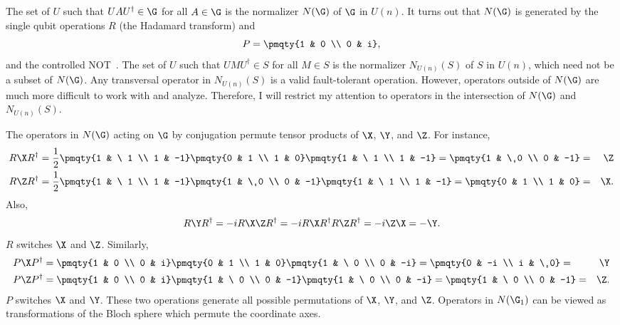 The set of $U$ such that $U A U^\dagger \in \G$ for all $A \in \G$ is the
normalizer $N(\G)$ of $\G$ in $U(n)$.  It turns out that $N(\G)$ is
generated by the single qubit operations $R$ (the Hadamard transform)
and
\begin{equation}
	P = \pmqty{1 & 0 \\ 0 & i},
\end{equation}
and the controlled NOT~\cite{bennett-tome,calderbank-stab}.  The set of
$U$ such that $U M U^\dagger \in S$ for all $M \in S$ is the normalizer
$N_{U(n)}(S)$ of $S$ in $U(n)$, which need not be a subset of $N(\G)$.  Any
transversal operator in $N_{U(n)}(S)$ is a valid fault-tolerant operation.
However, operators outside of $N(\G)$ are much more difficult to work
with and analyze.  Therefore, I will restrict my attention to operators in
the intersection of $N(\G)$ and $N_{U(n)}(S)$.

The operators in $N(\G)$ acting on $\G$ by conjugation permute tensor products
of $\X$, $\Y$, and $\Z$.  For instance,
\begin{eqnarray}
	R \X R^\dagger & = \frac{1}{2} \pmqty{1 & \ 1 \\ 1 & -1} \pmqty{0 &
	1 \\ 1 & 0} \pmqty{1 & \ 1 \\ 1 & -1} = \pmqty{1 & \ 0 \\ 0 & -1} =
	& \Z \\
	R \Z R^\dagger & = \frac{1}{2} \pmqty{1 & \ 1 \\ 1 & -1} \pmqty{1 & \
		0 \\ 0 & -1} \pmqty{1 & \ 1 \\ 1 & -1} = \pmqty{0 & 1 \\ 1 & 0} = &
	\X.
\end{eqnarray}
Also,
\begin{equation}
	R \Y R^\dagger = -i R \X \Z R^\dagger = -i R \X R^\dagger R \Z R^\dagger = -
	i \Z \X = -\Y.
\end{equation}
$R$ switches $\X$ and $\Z$.  Similarly,
\begin{eqnarray}
	P \X P^\dagger & = \pmqty{1 & 0 \\ 0 & i} \pmqty{0 & 1 \\ 1 & 0}
	\pmqty{1 & \ 0 \\ 0 & -i} = \pmqty{0 & -i \\ i & \ 0} = & \Y \\
	P \Z P^\dagger & = \pmqty{1 & 0 \\ 0 & i} \pmqty{1 & \ 0 \\ 0 &
	-1} \pmqty{1 & \ 0 \\ 0 & -i} = \pmqty{1 & \ 0 \\ 0 & -1} = & \Z.
\end{eqnarray}
$P$ switches $\X$ and $\Y$.  These two operations generate all possible
permutations of $\X$, $\Y$, and $\Z$.  Operators in $N(\G_1)$ can be
viewed as transformations of the Bloch sphere which permute the coordinate
axes.

